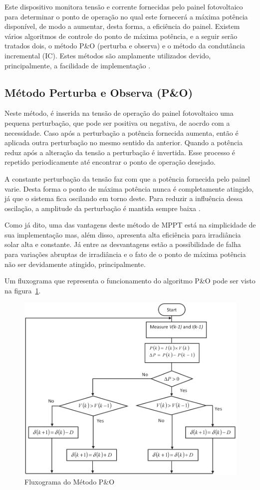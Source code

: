 \documentclass[
	12pt,				%
	openright,			%
	onseside,
	a4paper,			%
	english,			%
	french,				%
	spanish,			%
	brazil,				%
	]{abntex2}
\begin{document}
Este dispositivo monitora tensão e corrente fornecidas pelo painel fotovoltaico para determinar o ponto de operação no qual este fornecerá a máxima potência disponível, de modo a aumentar, desta forma, a eficiência do painel. Existem vários algoritmos de controle do ponto de máxima potência, e a seguir serão tratados dois, o método P\&O (perturba e observa) e o método da condutância incremental (IC). Estes métodos são amplamente utilizados devido, principalmente, a facilidade de implementação \cite{MPPT_P&O_IC}\cite{Talha_MPPT}.


\subsection{Método Perturba e Observa (P\&O)}

Neste método, é inserida na tensão de operação do painel fotovoltaico uma pequena perturbação, que pode ser positiva ou negativa, de aocrdo com a necessidade. Caso após a perturbação a potência fornecida aumenta, então é aplicada outra perturbação no mesmo sentido da anterior. Quando a potência reduz após a alteração da tensão a perturbação é invertida. Esse processo é repetido periodicamente até encontrar o ponto de operação desejado\cite{Talha_MPPT}.

A constante perturbação da tensão faz com que a potência fornecida pelo painel varie. Desta forma o ponto de máxima potência nunca é completamente atingido, já que o sistema fica oscilando em torno deste. Para reduzir a influência dessa oscilação, a amplitude da perturbação é mantida sempre baixa \cite{MPPT_P&O_IC}.

Como já dito, uma das vantagens deste método de MPPT está na simplicidade de sua implementação mas, além disso, apresenta alta eficiência para irradiância solar alta e constante. Já entre as desvantagens estão a possibilidade de falha para variações abruptas de irradiância e o fato de o ponto de máxima potência não ser devidamente atingido, principalmente\cite{MPPT_P&O_IC}.

Um fluxograma que representa o funcionamento do algoritmo P\&O pode ser visto na figura~\ref{fig:PeO_Flux}.

\begin{figure}[]
	\begin{center}
		\includegraphics[width=0.55 \linewidth]{peo_flow}
		\caption{Fluxograma do Método P\&O \cite{Talha_MPPT}}
		\label{fig:PeO_Flux}
	\end{center}
\end{figure}
\end{document}
